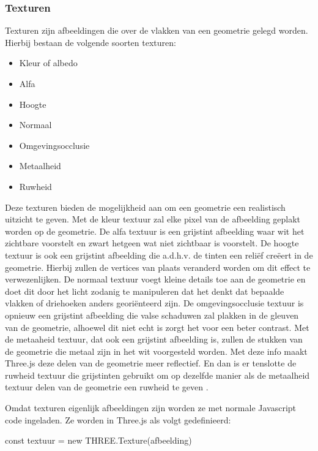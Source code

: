 \newpage
\subsubsection{Texturen}

Texturen zijn afbeeldingen die over de vlakken van een geometrie gelegd worden. Hierbij bestaan de volgende soorten texturen: 

\begin{itemize}
\item Kleur of albedo
\item Alfa
\item Hoogte
\item Normaal
\item Omgevingsocclusie
\item Metaalheid
\item Ruwheid
\end{itemize}

Deze texturen bieden de mogelijkheid aan om een geometrie een realistisch uitzicht te geven. Met de kleur textuur zal elke pixel van de afbeelding geplakt worden op de geometrie. De alfa textuur is een grijstint afbeelding waar wit het zichtbare voorstelt en zwart hetgeen wat niet zichtbaar is voorstelt. De hoogte textuur is ook een grijstint afbeelding die a.d.h.v. de tinten een reliëf creëert in de geometrie. Hierbij zullen de vertices van plaats veranderd worden om dit effect te verwezenlijken. De normaal textuur voegt kleine details toe aan de geometrie en doet dit door het licht zodanig te manipuleren dat het denkt dat bepaalde vlakken of driehoeken anders georiënteerd zijn. De omgevingsocclusie textuur is opnieuw een grijstint afbeelding die valse schaduwen zal plakken in de gleuven van de geometrie, alhoewel dit niet echt is zorgt het voor een beter contrast. Met de metaaheid textuur, dat ook een grijstint afbeelding is, zullen de stukken van de geometrie die metaal zijn in het wit voorgesteld worden. Met deze info maakt Three.js deze delen van de geometrie meer reflectief. En dan is er tenslotte de ruwheid textuur die grijstinten gebruikt om op dezelfde manier als de metaalheid textuur delen van de geometrie een ruwheid te geven \autocite{Simon2023}.

Omdat texturen eigenlijk afbeeldingen zijn worden ze met normale Javascript code ingeladen. Ze worden in Three.js als volgt gedefinieerd:

\begin{LVerbatim}
const textuur = new THREE.Texture(afbeelding)
\end{LVerbatim}

